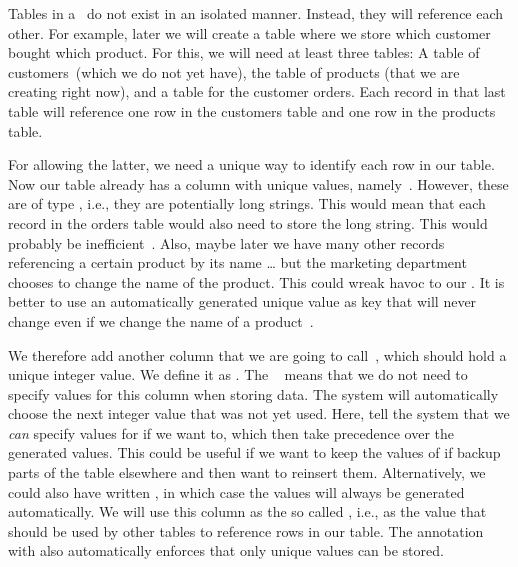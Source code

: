 Tables in a \db\ do not exist in an isolated manner.
Instead, they will reference each other.
For example, later we will create a table where we store which customer bought which product.
For this, we will need at least three tables:
A table of customers~(which we do not yet have), the table of products (that we are creating right now), and a table for the customer orders.
Each record in that last table will reference one row in the customers table and one row in the products table.

For allowing the latter, we need a unique way to identify each row in our table.
Now our table already has a column with unique values, namely~.
However, these are of type , i.e., they are potentially long strings.
This would mean that each record in the orders table would also need to store the long  string.
This would probably be inefficient~\cite{SE:DA:2014VPKM}.
Also, maybe later we have many other records referencing a certain product by its name {\dots} but the marketing department chooses to change the name of the product.
This could wreak havoc to our \db.
It is better to use an automatically generated unique value as key that will never change even if we change the name of a product~\cite{B2025DS:SBPASG}.%
%
\begin{sloppypar}%
We therefore add another column that we are going to call~, which should hold a unique integer value.
We define it as .
The ~\cite{PGDG:PD:IC,PGDG:PD:GC} means that we do not need to specify values for this column when storing data.
The system will automatically choose the next integer value that was not yet used.
Here,  tell the system that we \emph{can} specify values for  if we want to, which then take precedence over the generated values.
This could be useful if we want to keep the values of  if backup parts of the table elsewhere and then want to reinsert them.
Alternatively, we could also have written , in which case the  values will always be generated automatically.
We will use this column as the so called , i.e., as the value that should be used by other tables to reference rows in our  table.
The annotation with  also automatically enforces that only unique values can be stored.%
\end{sloppypar}%
